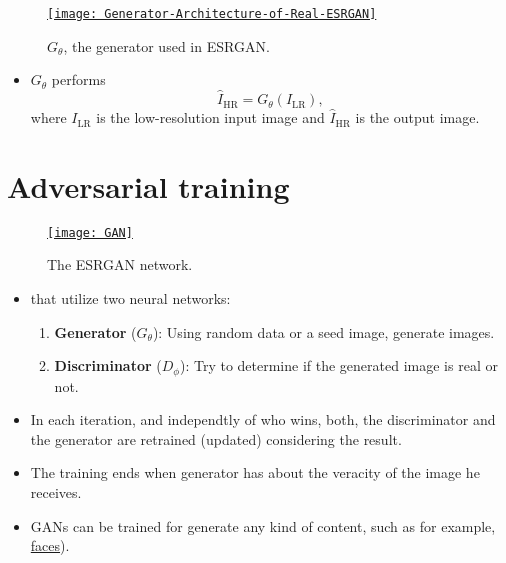 \begin{figure}[H]
  \vspace{0ex}
  \centering
  \href{https://arxiv.org/abs/2207.08036}{\texttt{[image: Generator-Architecture-of-Real-ESRGAN]}}
  \caption{$G_\theta$, the generator used in \gls{ESRGAN}.}
  \label{fig:ESRGAN_generator}
\end{figure}

\begin{itemize}
\item $G_\theta$ performs
  \begin{equation}
    \hat{I}_{\text{HR}} = G_\theta(I_{\text{LR}}),
  \end{equation}
  where $I_{\text{LR}}$ is the low-resolution input image and
  $\hat{I}_{\text{HR}}$ is the  output image.
\end{itemize}

\section*{Adversarial training}

\begin{figure}[H]
  \vspace{0ex}
  \centering
  \href{https://semiengineering.com/knowledge_centers/artificial-intelligence/neural-networks/generative-adversarial-network-gan/}{\texttt{[image: GAN]}}
  \caption{The \gls{ESRGAN} network.}
  \label{fig:ESRGAN}
\end{figure}

\begin{itemize}
\item {} that
  utilize two neural networks:
  \begin{enumerate}
  \item \textbf{Generator} ($G_\theta$): Using random data or a seed image,
    generate  images.
  \item \textbf{Discriminator} ($D_\phi$): Try to determine if the generated
    image is real or not.
  \end{enumerate}
\item In each iteration, and independtly of who wins, both, the
  discriminator and the generator are retrained (updated) considering
  the result.
\item The training ends when generator has   about the veracity of the image
  he receives.
\item \glspl{GAN} can be trained for generate any kind of content,
  such as for example,
  \href{https://thispersondoesnotexist.com/}{faces}).
\end{itemize}

